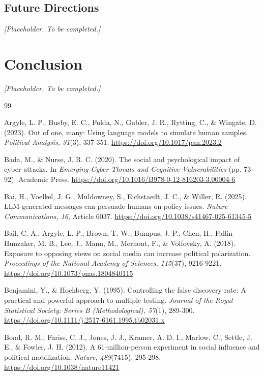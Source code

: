 \documentclass[11pt,a4paper]{article}
\newcommand{\doiurl}[1]{\href{https://doi.org/#1}{https://doi.org/#1}}
\begin{document}
\subsection{Future Directions}

\noindent\textit{[Placeholder. To be completed.]}

\section{Conclusion}

\noindent\textit{[Placeholder. To be completed.]}

\clearpage
\begin{thebibliography}{99}
\setlength{\itemsep}{0.45em}

Argyle, L. P., Busby, E. C., Fulda, N., Gubler, J. R., Rytting, C., \& Wingate, D. (2023). Out of
one, many: Using language models to simulate human samples. \textit{Political Analysis, 31}(3),
337-351. \doiurl{10.1017/pan.2023.2}

Bada, M., \& Nurse, J. R. C. (2020). The social and psychological impact of cyber-attacks. In
\textit{Emerging Cyber Threats and Cognitive Vulnerabilities} (pp. 73-92). Academic Press.
\doiurl{10.1016/B978-0-12-816203-3.00004-6}

Bai, H., Voelkel, J. G., Muldowney, S., Eichstaedt, J. C., \& Willer, R. (2025). LLM-generated
messages can persuade humans on policy issues. \textit{Nature Communications, 16}, Article 6037.
\doiurl{10.1038/s41467-025-61345-5}

Bail, C. A., Argyle, L. P., Brown, T. W., Bumpus, J. P., Chen, H., Fallin Hunzaker, M. B., Lee, J.,
Mann, M., Merhout, F., \& Volfovsky, A. (2018). Exposure to opposing views on social media can
increase political polarization. \textit{Proceedings of the National Academy of Sciences,
115}(37), 9216-9221. \doiurl{10.1073/pnas.1804840115}

Benjamini, Y., \& Hochberg, Y. (1995). Controlling the false discovery rate: A practical and
powerful approach to multiple testing. \textit{Journal of the Royal Statistical Society: Series B
(Methodological), 57}(1), 289-300. \doiurl{10.1111/j.2517-6161.1995.tb02031.x}

Bond, R. M., Fariss, C. J., Jones, J. J., Kramer, A. D. I., Marlow, C., Settle, J. E., \& Fowler,
J. H. (2012). A 61-million-person experiment in social influence and political mobilization.
\textit{Nature, 489}(7415), 295-298. \doiurl{10.1038/nature11421}


\end{thebibliography}
\end{document}
